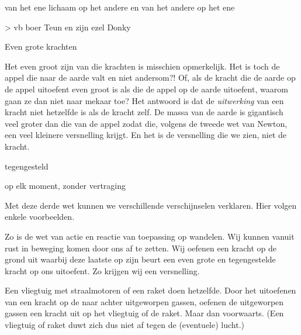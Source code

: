 \documentclass{ximera}
\begin{document}

\begin{remark}\nl
	van het ene lichaam op het andere en van het andere op het ene	

	> vb boer Teun en zijn ezel Donky
\end{remark}

\begin{remark}\nl
	Even grote krachten

	Het even groot zijn van die krachten is misschien opmerkelijk. Het is toch de appel die naar de aarde valt en niet andersom?! Of, als de kracht die de aarde op de appel uitoefent even groot is als die de appel op de aarde uitoefent, waarom gaan ze dan niet naar mekaar toe? Het antwoord is dat de \emph{uitwerking} van een kracht niet hetzelfde is als de kracht zelf. De massa van de aarde is gigantisch veel groter dan die van de appel zodat die, volgens de tweede wet van Newton, een veel kleinere versnelling krijgt. En het is de versnelling die we zien, niet de kracht.
\end{remark}

\begin{remark}\nl
	tegengesteld
\end{remark}

\begin{remark}\nl
	op elk moment, zonder vertraging
\end{remark}
	
	
	Met deze derde wet kunnen we verschillende verschijnselen verklaren. Hier volgen enkele voorbeelden.

\begin{example} \nl
	
	Zo is de wet van actie en reactie van toepassing op wandelen. Wij kunnen vanuit rust in beweging komen door ons af te zetten. Wij oefenen een kracht op de grond uit waarbij deze laatste op zijn beurt een even grote en tegengestelde kracht op ons uitoefent. Zo krijgen wij een versnelling. 

\end{example}

\begin{example}
	Een vliegtuig met straalmotoren of een raket doen hetzelfde. Door het uitoefenen van een kracht op de naar achter uitgeworpen gassen, oefenen de uitgeworpen gassen een kracht uit op het vliegtuig of de raket. Maar dan voorwaarts. (Een vliegtuig of raket duwt zich dus niet af tegen de (eventuele) lucht.)
\end{example}
\end{document}
